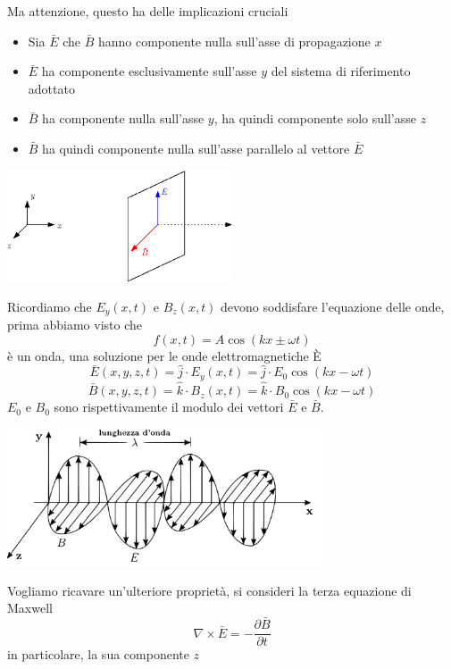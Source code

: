 \documentclass[10pt, letterpaper]{report}
\begin{document}
Ma attenzione, questo ha delle implicazioni cruciali\begin{itemize}
    \item Sia $\bar E$ che $\bar B$ hanno componente nulla sull'asse di propagazione $x$
    \item $\bar E$ ha componente esclusivamente sull'asse $y$ del sistema di riferimento adottato 
    \item $\bar B$ ha componente nulla sull'asse $y$, ha quindi componente solo sull'asse $z$
    \item $\bar B$ ha quindi componente nulla sull'asse parallelo al vettore $\bar E$
\end{itemize}
\begin{center}
    \includegraphics[width=0.5\textwidth]{images/EM1}
\end{center}
Ricordiamo che $E_y(x,t)$ e $B_z(x,t)$ devono soddisfare l'equazione delle onde, prima abbiamo visto che $$ f(x,t)=
A\cos(kx\pm\omega t)
$$
è un onda, una soluzione per le onde elettromagnetiche È 
$$ 
\bar E(x,y,z,t) = \hat j \cdot E_y(x,t)=\hat j\cdot E_0\cos(kx-\omega t)
$$
$$ 
\bar B(x,y,z,t) = \hat k\cdot B_z(x,t)=\hat k \cdot B_0\cos(kx-\omega t)
$$
$E_0$ e $B_0$ sono rispettivamente il modulo dei vettori $\bar E$ e $\bar B$.\begin{center}
    \includegraphics[width=0.7\textwidth]{images/EM.pdf}
\end{center}
Vogliamo ricavare un'ulteriore proprietà, si consideri la terza equazione di Maxwell$$\nabla \times \bar E = -\dfrac{\partial \bar B }{\partial t}$$ in particolare, la sua componente $z$
\end{document}
